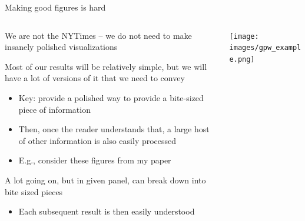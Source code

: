 \documentclass[notes,11pt, aspectratio=169]{beamer}
\newenvironment{wideitemize}{\itemize\addtolength{\itemsep}{10pt}}{\enditemize}
\begin{document}
\begin{frame}{Making good figures is hard}
  \begin{columns}[T] %
    \begin{column}{.6\textwidth}
  \begin{wideitemize}
  \item We are not the NYTimes -- we do not need to make insanely polished visualizations
  \item Most of our results will be relatively simple, but we will
    have a lot of versions of it that we need to convey
    \begin{itemize}
    \item Key: provide a polished way to provide a bite-sized piece of information
    \item Then, once the reader understands that, a large host of
      other information is also easily processed
    \item E.g., consider these figures from my paper
    \end{itemize}
  \item A lot going on, but in given panel, can break down into bite
    sized pieces
    \begin{itemize}
    \item Each subsequent result is then easily understood
    \end{itemize}
  \end{wideitemize}
  \end{column}%
  \hfill%
  \begin{column}{.4\textwidth}
    \texttt{[image: images/gpw\_example.png]}
  \end{column}
\end{columns}
\end{frame}
\end{document}
